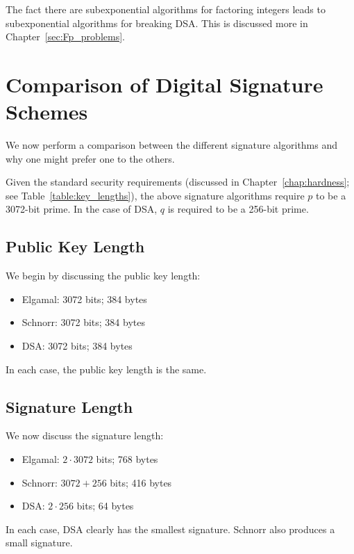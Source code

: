 The fact there are subexponential algorithms for factoring
integers leads to subexponential algorithms for breaking DSA.
This is discussed more in Chapter~\ref{sec:Fp_problems}.



\section{Comparison of Digital Signature Schemes}
\label{sec:signatures_comparison}

We now perform a comparison between the different signature
algorithms and why one might prefer one to the others.

Given the standard security requirements
(discussed in Chapter~\ref{chap:hardness}; see Table~\ref{table:key_lengths}),
the above signature algorithms require $p$ to be a 3072-bit prime.
In the case of DSA, $q$ is required to be a 256-bit prime.

\subsection{Public Key Length}

We begin by discussing the public key length:

\begin{itemize}
    \item Elgamal: 3072 bits; 384 bytes
    \item Schnorr: 3072 bits; 384 bytes
    \item DSA: 3072 bits; 384 bytes
\end{itemize}

\noindent
In each case, the public key length is the same.

\subsection{Signature Length}

We now discuss the signature length:

\begin{itemize}
    \item Elgamal: $2\cdot3072$ bits; 768 bytes
    \item Schnorr: $3072 + 256$ bits; 416 bytes
    \item DSA: $2\cdot 256$ bits; 64 bytes
\end{itemize}

\noindent
In each case, DSA clearly has the smallest signature.
Schnorr also produces a small signature.

